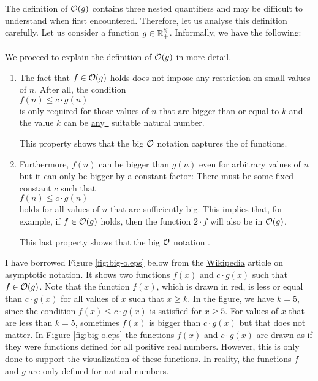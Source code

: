 The definition of $\mathcal{O}(g)$ contains three nested quantifiers and may be difficult to understand
when first encountered.  Therefore, let us analyse this definition carefully.  Let us consider a
function $g \in {\mathbb R}_+^{\mathbb N}$.  Informally, we have the following:
\\[0.2cm]
\hspace*{1.3cm}
\colorbox{red}{}
\\[0.2cm]
We proceed to explain the definition of $\mathcal{O}(g)$ in more detail.
\begin{enumerate}
\item The fact that $f \in \mathcal{O}(g)$ holds does not impose any restriction on small values of $n$.
      After all, the condition
      \\[0.2cm]
      \hspace*{1.3cm}
      $f(n) \leq c \cdot g(n)$
      \\[0.2cm]
      is only required for those values of $n$ that are bigger than or equal to $k$ and the value
      $k$ can be \underline{an}y\hspace*{-0.1cm}\underline{\ } suitable natural number.

      This property shows that the big $\mathcal{O}$ notation captures the  of functions.
\item Furthermore, $f(n)$ can be bigger than $g(n)$ even for arbitrary values of $n$ 
      but it can only be bigger by a constant factor:  There must be some fixed constant $c$
      such that 
      \\[0.2cm]
      \hspace*{1.3cm}
      $f(n) \leq c \cdot g(n)$
      \\[0.2cm]
      holds for all values of $n$ that are sufficiently big.  This implies that, for example, if $f \in \mathcal{O}(g)$
      holds, then the function $2 \cdot f$ will also be in $\mathcal{O}(g)$.

      This last property shows that the big $\mathcal{O}$ notation .
\end{enumerate}
I have borrowed Figure \ref{fig:big-o.eps} below from the \href{http://www.wikipedia.org}{Wikipedia} article on 
\href{http://en.wikipedia.org/wiki/Asymptotic_notation}{asymptotic notation}.  It shows two functions 
$f(x)$ and $c \cdot g(x)$ such that $f \in \mathcal{O}(g)$.  Note that the function $f(x)$, which is drawn
in red, is less or equal than $c \cdot g(x)$ for all values of $x$ such that $x \geq k$.  In the
figure, we have $k=5$, since the condition $f(x) \leq c \cdot g(x)$ is satisfied for $x \geq 5$. For
values of $x$ that are less than $k = 5$, sometimes $f(x)$ is bigger than $c \cdot g(x)$ but that does
not matter.  In Figure \ref{fig:big-o.eps} the functions $f(x)$ and $c \cdot g(x)$ are drawn as if they were
functions defined for all positive real numbers.  However, this is only done to support the
visualization of these functions.  In reality, the functions $f$ and $g$ are only defined for
natural numbers.


